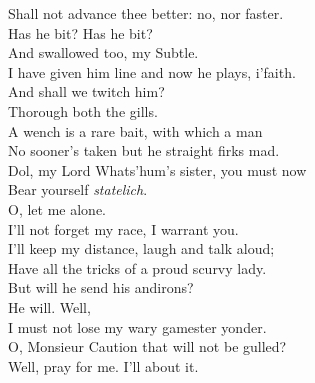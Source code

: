 \documentclass[a4paper,oneside,12pt]{memoir}
\begin{document}
\begin{drama*}
\mammonspeaks Shall not advance thee better: no, nor faster.\\
\subtlespeaks Has he bit? Has he bit?\\
\facespeaks {} And swallowed too, my Subtle.\\
I have given him line and now he plays, i'faith.\\
\subtlespeaks And shall we twitch him?\\
\facespeaks {} Thorough both the gills.\\
A wench is a rare bait, with which a man\\
No sooner's taken but he straight firks mad.\\
\subtlespeaks Dol, my Lord Whats'hum's sister, you must now\\
Bear yourself \emph{statelich}.\\
\dolspeaks {} O, let me alone.\\
I'll not forget my race, I warrant you.\\
I'll keep my distance, laugh and talk aloud;\\
Have all the tricks of a proud scurvy lady.\\
\subtlespeaks But will he send his andirons?\\
\facespeaks {} He will. Well,\\
I must not lose my wary gamester yonder.\\
\subtlespeaks O, Monsieur Caution that will not be gulled?\\
\facespeaks Well, pray for me. I'll about it.\\

\scene


\end{drama*}
\end{document}
